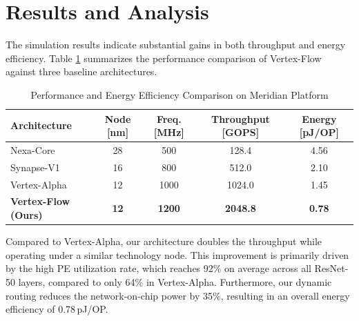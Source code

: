 \section{Results and Analysis}
\label{sec:results}
The simulation results indicate substantial gains in both throughput and energy efficiency. Table \ref{tab:results} summarizes the performance comparison of Vertex-Flow against three baseline architectures.

\begin{table}[t]
\centering
\small
\caption{Performance and Energy Efficiency Comparison on Meridian Platform}
\label{tab:results}
\begin{tabular}{lcccc}
\toprule
\textbf{Architecture} & \textbf{Node [nm]} & \textbf{Freq. [MHz]} & \textbf{Throughput [GOPS]} & \textbf{Energy [pJ/OP]} \\
\midrule
Nexa-Core \cite{nexa2024} & 28 & 500 & 128.4 & 4.56 \\
Synapse-V1 \cite{synapse2023} & 16 & 800 & 512.0 & 2.10 \\
Vertex-Alpha \cite{vertex2025} & 12 & 1000 & 1024.0 & 1.45 \\
\midrule
\textbf{Vertex-Flow (Ours)} & \textbf{12} & \textbf{1200} & \textbf{2048.8} & \textbf{0.78} \\
\bottomrule
\end{tabular}
\end{table}

Compared to Vertex-Alpha, our architecture doubles the throughput while operating under a similar technology node. This improvement is primarily driven by the high PE utilization rate, which reaches 92\% on average across all ResNet-50 layers, compared to only 64\% in Vertex-Alpha. Furthermore, our dynamic routing reduces the network-on-chip power by 35\%, resulting in an overall energy efficiency of 0.78\,pJ/OP.
